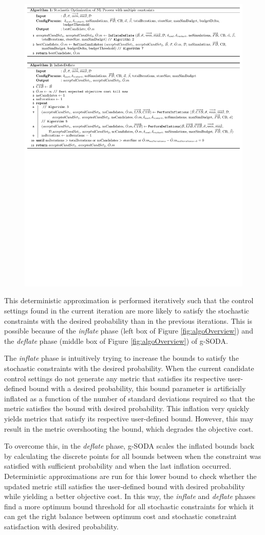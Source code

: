 \documentclass[a4paper, 12pt]{article} %
\begin{document}
\begin{figure}
	\begin{center}
	\includegraphics[width=.7\textwidth]{pseudoCode/Algo1-2.pdf}
	\end{center}

\end{figure}
This deterministic approximation is performed iteratively such that the control settings found in the current iteration are more likely to satisfy the stochastic constraints with the desired probability than in the previous iterations. This is possible because of the \textit{inflate} phase (left box of Figure \ref{fig:algoOverview}) and the \textit{deflate} phase (middle box of Figure \ref{fig:algoOverview}) of g-SODA. 

The \textit{inflate} phase is intuitively trying to increase the bounds to satisfy the stochastic constraints with the desired probability. 
When the current candidate control settings do not generate any metric that satisfies its respective user-defined bound with a desired probability, this bound parameter is artificially inflated as a function of the number of standard deviations required so that the metric satisfies the bound with desired probability.
This inflation very quickly yields metrics that satisfy its respective user-defined bound. However, this may result in the metric overshooting the bound, which degrades the objective cost. 

To overcome this, in the \textit{deflate} phase, g-SODA scales the inflated bounds back by calculating the discrete points for all bounds between when the constraint was satisfied with sufficient probability and when the last inflation occurred.
 Deterministic approximations are run for this lower bound to check whether the updated metric still satisfies the user-defined bound with desired probability while yielding a better objective cost. 
 In this way, the \textit{inflate} and \textit{deflate} phases find a more optimum bound threshold for all stochastic constraints for which it can get the right balance between optimum cost and stochastic constraint satisfaction with desired probability.
\end{document}
